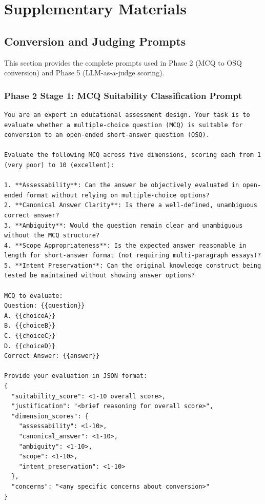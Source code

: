 
\appendix

\chapter{Supplementary Materials}\label{app:supplementary}

\section{Conversion and Judging Prompts}\label{app:conversion_prompts}

This section provides the complete prompts used in Phase 2 (MCQ to OSQ conversion) and Phase 5 (LLM-as-a-judge scoring).

\subsection{Phase 2 Stage 1: MCQ Suitability Classification Prompt}

\begin{lstlisting}[basicstyle=\small\ttfamily,breaklines=true]
You are an expert in educational assessment design. Your task is to evaluate whether a multiple-choice question (MCQ) is suitable for conversion to an open-ended short-answer question (OSQ).

Evaluate the following MCQ across five dimensions, scoring each from 1 (very poor) to 10 (excellent):

1. **Assessability**: Can the answer be objectively evaluated in open-ended format without relying on multiple-choice options?
2. **Canonical Answer Clarity**: Is there a well-defined, unambiguous correct answer?
3. **Ambiguity**: Would the question remain clear and unambiguous without the MCQ structure?
4. **Scope Appropriateness**: Is the expected answer reasonable in length for short-answer format (not requiring multi-paragraph essays)?
5. **Intent Preservation**: Can the original knowledge construct being tested be maintained without showing answer options?

MCQ to evaluate:
Question: {{question}}
A. {{choiceA}}
B. {{choiceB}}
C. {{choiceC}}
D. {{choiceD}}
Correct Answer: {{answer}}

Provide your evaluation in JSON format:
{
  "suitability_score": <1-10 overall score>,
  "justification": "<brief reasoning for overall score>",
  "dimension_scores": {
    "assessability": <1-10>,
    "canonical_answer": <1-10>,
    "ambiguity": <1-10>,
    "scope": <1-10>,
    "intent_preservation": <1-10>
  },
  "concerns": "<any specific concerns about conversion>"
}
\end{lstlisting}

